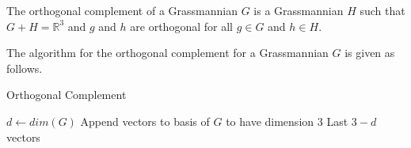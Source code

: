 \documentclass[12pt]{article}
\newcommand{\R}{\mathbb{R}}
\newenvironment{definition}[2][Definition]{\begin{trivlist}
\item[\hskip \labelsep {\bfseries #1}\hskip \labelsep {\bfseries #2.}]}{\end{trivlist}}
\newenvironment{proposition}[2][Proposition]{\begin{trivlist}
\item[\hskip \labelsep {\bfseries #1}\hskip \labelsep {\bfseries #2.}]}{\end{trivlist}}
\begin{document}
\begin{definition}{4.1}
The orthogonal complement of a Grassmannian \(G\) is a Grassmannian \(H\) such that \(G + H = \R^3\) and \(g\) and \(h\) are orthogonal for all \(g \in G\) and \(h \in H\).
\end{definition}

\begin{proposition}{4.2}
The algorithm for the orthogonal complement for a Grassmannian \(G\) is given as follows.

\begin{algorithm}[H]
\caption{Orthogonal Complement}
\begin{algorithmic}[5]
\State $d \gets dim(G)$
\State Append vectors to basis of $G$ to have dimension 3
\Return Last $3-d$ vectors
\EndProcedure
\end{algorithmic}
\end{algorithm}

\end{proposition}
\end{document}

